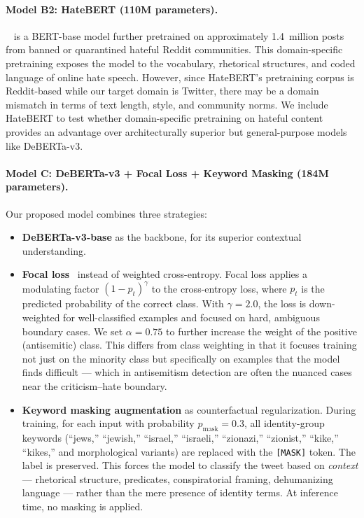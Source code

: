 \paragraph{Model B2: HateBERT (110M parameters).}
\modelBB{}~\citep{caselli2021hatebert} is a BERT-base model further pretrained on approximately 1.4~million posts from banned or quarantined hateful Reddit communities. This domain-specific pretraining exposes the model to the vocabulary, rhetorical structures, and coded language of online hate speech. However, since HateBERT's pretraining corpus is Reddit-based while our target domain is Twitter, there may be a domain mismatch in terms of text length, style, and community norms. We include HateBERT to test whether domain-specific pretraining on hateful content provides an advantage over architecturally superior but general-purpose models like DeBERTa-v3.

\paragraph{Model C: DeBERTa-v3 + Focal Loss + Keyword Masking (184M parameters).}
Our proposed model combines three strategies:
\begin{itemize}[leftmargin=*,itemsep=2pt]
    \item \textbf{DeBERTa-v3-base} as the backbone, for its superior contextual understanding.
    \item \textbf{Focal loss}~\citep{lin2017focal} instead of weighted cross-entropy. Focal loss applies a modulating factor $(1 - p_t)^\gamma$ to the cross-entropy loss, where $p_t$ is the predicted probability of the correct class. With $\gamma = 2.0$, the loss is down-weighted for well-classified examples and focused on hard, ambiguous boundary cases. We set $\alpha = 0.75$ to further increase the weight of the positive (antisemitic) class. This differs from class weighting in that it focuses training not just on the minority class but specifically on examples that the model finds difficult --- which in antisemitism detection are often the nuanced cases near the criticism--hate boundary.
    \item \textbf{Keyword masking augmentation} as counterfactual regularization. During training, for each input with probability $p_{\text{mask}} = 0.3$, all identity-group keywords (``jews,'' ``jewish,'' ``israel,'' ``israeli,'' ``zionazi,'' ``zionist,'' ``kike,'' ``kikes,'' and morphological variants) are replaced with the \texttt{[MASK]} token. The label is preserved. This forces the model to classify the tweet based on \emph{context} --- rhetorical structure, predicates, conspiratorial framing, dehumanizing language --- rather than the mere presence of identity terms. At inference time, no masking is applied.
\end{itemize}

